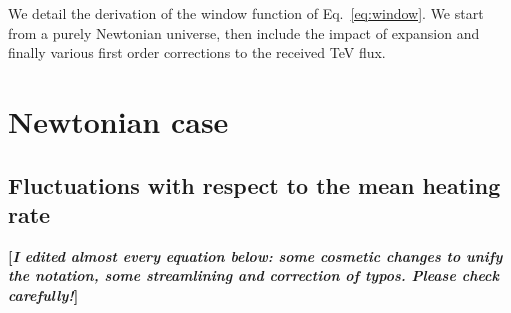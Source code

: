 \documentclass[twocolumns]{emulateapj}
\newcommand\Cc[1]{{\color{blue} \bf #1}} %
\begin{document}
\appendix

We detail the derivation of the window function of Eq.~\eqref{eq:window}. We start from a purely Newtonian universe, then include the impact of expansion and finally various first order corrections to the received TeV flux.\\

\section {Newtonian case}\label{sec:windon_newt}
\subsection {Fluctuations with respect to the mean heating rate}

\Cc{[{\em I edited almost every equation below: some cosmetic changes to unify the notation, some streamlining and correction of typos. Please check carefully!}]}
\end{document}

